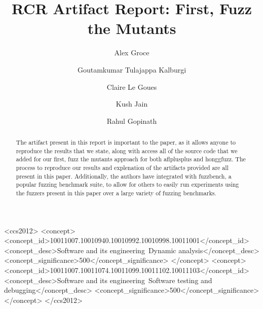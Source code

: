 \documentclass[manuscript,screen,review]{acmart}
\author{Alex Groce}
\affiliation{\institution{Northern Arizona University}\country{United States}}
\author{Goutamkumar Tulajappa Kalburgi}
\affiliation{\institution{Northern Arizona University}\country{United States}}
\author{Claire Le Goues}
\affiliation{\institution{Carnegie Mellon University}\country{United States}}
\author{Kush Jain}
\affiliation{\institution{Carnegie Mellon University}\country{United States}}
\author{Rahul Gopinath}
\affiliation{\institution{University of Sydney}\country{Australia}}
\renewcommand{\shortauthors}{Alex Groce, Kush Jain, Rijnard van Tonder, Goutamkumar Tulajappa Kalburgi, Claire Le Goues}
\begin{document}
\title{RCR Artifact Report: First, Fuzz the Mutants}


\renewcommand{\shortauthors}{Groce et al.}

\begin{abstract}
The artifact present in this report is important to the paper, as it allows anyone to reproduce the results that
we state, along with access all of the source code that we added for our first, fuzz the mutants approach for both 
aflplusplus and honggfuzz. The process to reproduce our results and explenation of the artifacts provided are all present
in this paper. Additionally, the authors have integrated with fuzzbench, a popular fuzzing benchmark suite, to allow for others 
to easily run experiments using the fuzzers present in this paper over a large variety of fuzzing benchmarks.
\end{abstract}


\begin{CCSXML}
<ccs2012>
<concept>
<concept_id>10011007.10010940.10010992.10010998.10011001</concept_id>
<concept_desc>Software and its engineering~Dynamic analysis</concept_desc>
<concept_significance>500</concept_significance>
</concept>
<concept>
<concept_id>10011007.10011074.10011099.10011102.10011103</concept_id>
<concept_desc>Software and its engineering~Software testing and debugging</concept_desc>
<concept_significance>500</concept_significance>
</concept>
</ccs2012>
\end{CCSXML}

\end{document}
